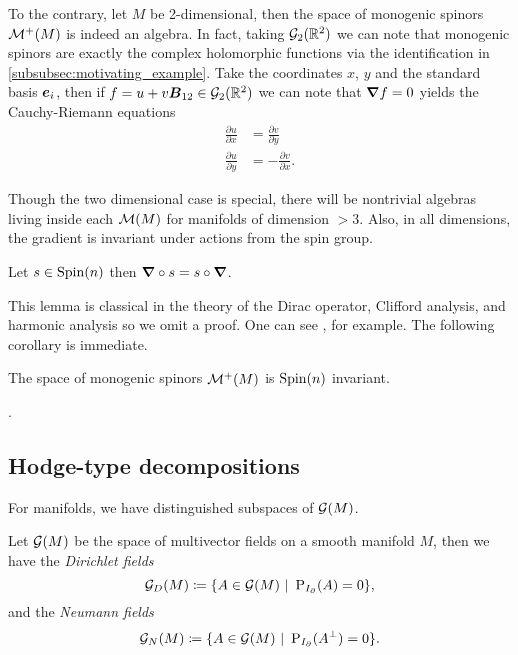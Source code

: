 To the contrary, let $M$ be 2-dimensional, then the space of monogenic spinors $\mathcal{M}^+(M)$ is indeed an algebra. In fact, taking $\mathcal{G}_2(\mathbb{R}^2)$ we can note that monogenic spinors are exactly the complex holomorphic functions via the identification in \cref{subsubsec:motivating_example}. Take the coordinates $x$, $y$ and the standard basis $\boldsymbol{e}_i$, then if $f=u+v\boldsymbol{B}_{12} \in \mathcal{G}_2(\mathbb{R}^2)$ we can note that $\boldsymbol{\nabla} f =0$ yields the Cauchy-Riemann equations
\begin{align}
\label{eq:cauchy_riemann_equations}
    \frac{\partial u}{\partial x} &= \frac{\partial v}{\partial y}\\
    \frac{\partial u}{\partial y} &= -\frac{\partial v}{\partial x}.
\end{align}

Though the two dimensional case is special, there will be nontrivial algebras living inside each $\mathcal{M}(M)$ for manifolds of dimension $>3$. Also, in all dimensions, the gradient is invariant under actions from the spin group.
\begin{lemma}
\label{lem:clifford_invariant}
Let $s\in \operatorname{Spin}(n)$ then $\boldsymbol{\nabla} \circ s = s \circ \boldsymbol{\nabla}$.
\end{lemma}
This lemma is classical in the theory of the Dirac operator, Clifford analysis, and harmonic analysis so we omit a proof.  One can see \cite{janssens_special_nodate}, for example. The following corollary is immediate.
\begin{corollary}
The space of monogenic spinors $\mathcal{M}^+(M)$ is $\operatorname{Spin}(n)$ invariant.
\end{corollary}
.



\subsection{Hodge-type decompositions}

For manifolds, we have distinguished subspaces of $\mathcal{G}(M)$. 
\begin{definition}
\label{def:dirichlet_neumann}
Let $\mathcal{G}(M)$ be the space of multivector fields on a smooth manifold $M$, then we have the \emph{Dirichlet fields}
\begin{equation}
\mathcal{G}_D(M) \coloneqq \{A \in \mathcal{G}(M) ~\vert~ \operatorname{P}_{I_{\partial}}(A) = 0 \},
\end{equation}
and the \emph{Neumann fields}
\begin{equation}
\mathcal{G}_N(M) \coloneqq \{A \in \mathcal{G}(M) ~\vert~ \operatorname{P}_{I_{\partial}}(A^\perp) = 0 \}.
\end{equation}
\end{definition}

